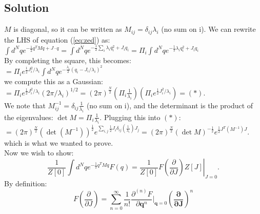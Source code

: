 \documentclass{article}
\begin{document}
\subsection*{Solution}
$M$ is diagonal, so it can be written as $M_{ij}=\delta_{ij}\lambda_i$ (no sum on i). We can rewrite the LHS of equation (\ref{eq:zed}) as:\\
$\int d^N q e^{-\frac{1}{2} q^T M q+J \cdot q}=\int d^N q e^{-\frac{1}{2} \sum_i \lambda_i q_i^2+J_iq_i}= \Pi_i \int d^N q e^{-\frac{1}{2} \lambda_i q_i^2+J_iq_i}$\\
By completing the square, this becomes:\\
$=\Pi_i e^{\frac{1}{2}J^2_i/\lambda_i}\int d^N q e^{-\frac{\lambda_i}{2}(q_i-J_i/\lambda_i)^2}$\\
we compute this as a Gaussian:\\
$=\Pi_i e^{\frac{1}{2}J^2_i/\lambda_i}(2\pi/\lambda_i)^{1/2}=(2\pi)^{\frac{N}{2}}(\Pi_i \frac{1}{\lambda_i})(\Pi_i e^{\frac{1}{2}J^2_i/\lambda_i})=(*)$. \\
We note that $M^{-1}_{ij}=\delta_{ij}\frac{1}{\lambda_i}$ (no sum on i), and the determinant is the product of the eigenvalues: $\det M =\Pi_i \frac{1}{\lambda_i}$. Plugging this into $(*)$:\\
$=(2\pi)^{\frac{N}{2}}(\det (M^{-1}))^{\frac{1}{2}}e^{\sum_{i,j} \frac{1}{2}J_i\delta_{ij}(\frac{1}{\lambda_i})J_j}=$$(2\pi)^{\frac{N}{2}}(\det M)^{-\frac{1}{2}}e^{ \frac{1}{2}J^T(M^{-1})J}$.\\
which is what we wanted to prove.\\
Now we wish to show:\\
\begin{equation} \label{eq:gauss prove}
\frac{1}{Z[0]} \int d^N q e^{-\frac{1}{2} q^T M q} F(q)=\left.\frac{1}{Z[0]} F\left(\frac{\partial}{\partial J}\right) Z[J]\right|_{J=0} .
\end{equation}
By definition:
\begin{equation*}
    F(\frac{\partial}{\partial J})=\sum_{n=0}^{\infty} \frac{1}{n!}\frac{\partial^{(n)}F}{\partial \mathbf{q}^n}|_{\mathbf{q}=0}(\mathbf{\frac{\partial}{\partial J}})^n
\end{equation*}
\end{document}
